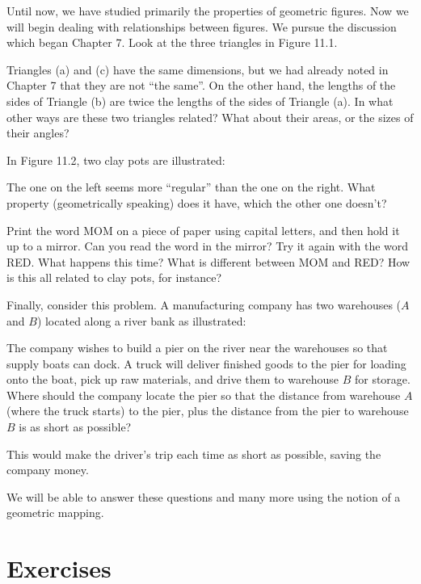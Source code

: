 \documentclass[12pt]{book} %
\begin{document}
\begin{ExerciseList}
Until now, we have studied primarily the properties of geometric figures. Now we will begin dealing with relationships between figures. We pursue the discussion which began Chapter 7. Look at the three triangles in Figure 11.1.


Triangles (a) and (c) have the same dimensions, but we had already noted in Chapter 7 that they are not ``the same''. On the other hand, the lengths of the sides of Triangle (b) are twice the lengths of the sides of Triangle (a). In what other ways are these two triangles related? What about their areas, or the sizes of their angles?

In Figure 11.2, two clay pots are illustrated:


The one on the left seems more ``regular'' than the one on the right. What property (geometrically speaking) does it have, which the other one doesn't?

Print the word MOM on a piece of paper using capital letters, and then hold it up to a mirror. Can you read the word in the mirror? Try it again with the word RED. What happens this time? What is different between MOM and RED? How is this all related to clay pots, for instance?

Finally, consider this problem. A manufacturing company has two warehouses ($A$ and $B$) located along a river bank as illustrated:


The company wishes to build a pier on the river near the warehouses so that supply boats can dock. A truck will deliver finished goods to the pier for loading onto the boat, pick up raw materials, and drive them to warehouse $B$ for storage. Where should the company locate the pier so that the distance from warehouse $A$ (where the truck starts) to the pier, plus the distance from the pier to warehouse $B$ is as short as possible?

This would make the driver's trip each time as short as possible, saving the company money.

We will be able to answer these questions and many more using the notion of a geometric mapping.

\section*{Exercises}


\end{ExerciseList}
\end{document}
